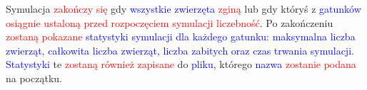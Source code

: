 \documentclass{article}
\begin{document}
Symulacja \textcolor{red}{zakończy się} gdy \textcolor{blue}{wszystkie zwierzęta} \textcolor{red}{zginą} lub gdy któryś z \textcolor{blue}{gatunków} \textcolor{red}{osiągnie ustaloną przed rozpoczęciem symulacji liczebność}. Po zakończeniu \textcolor{red}{zostaną pokazane} \textcolor{blue}{statystyki symulacji dla każdego gatunku: maksymalna liczba zwierząt, całkowita liczba zwierząt, liczba zabitych oraz czas trwania symulacji. Statystyki} te \textcolor{red}{zostaną również zapisane} do \textcolor{blue}{pliku}, którego \textcolor{blue}{nazwa} \textcolor{red}{zostanie podana} na początku.
\end{document}
